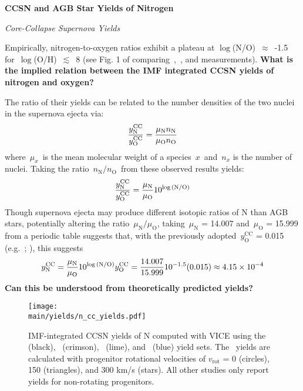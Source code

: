 \documentclass[\main/notes.tex]{subfiles}
\begin{document}
 
\begin{center} 
\textbf{{\Large CCSN and AGB Star Yields of Nitrogen}} 
\end{center} 

\noindent 
{\Large \textit{Core-Collapse Supernova Yields}} 
\par\noindent 
Empirically, nitrogen-to-oxygen ratios exhibit a plateau at 
$\log$(N/O)~$\approx$~-1.5 for~$\log$(O/H)~$\lesssim$~8 (see Fig. 1 of 
\citealp{Vincenzo2016} comparing~\citealp{Berg2012},~\citealp*{Izotov2012}, and 
\citealp{James2015} measurements). 
\twolineskip 
\textbf{What is the implied relation between the IMF integrated CCSN yields of 
nitrogen and oxygen?} 
\par\noindent 
The ratio of their yields can be related to the number densities of the two 
nuclei in the supernova ejecta via: 
\begin{equation} 
\frac{\displaystyle y_\text{N}^\text{CC}}{\displaystyle y_\text{O}^\text{CC}} = 
\frac{\displaystyle \mu_\text{N}n_\text{N}}{\displaystyle \mu_\text{O}n_\text{O}} 
\end{equation} 
where~$\mu_x$~is the mean molecular weight of a species~$x$~and~$n_x$ is the 
number of nuclei. Taking the ratio~$n_\text{N}/n_\text{O}$~from these observed 
results yields: 
\begin{equation} 
\frac{\displaystyle y_\text{N}^\text{CC}}{\displaystyle y_\text{O}^\text{CC}} = 
\frac{\displaystyle \mu_\text{N}}{\displaystyle \mu_\text{O}}10^{\log\text{(N/O)}} 
\end{equation} 
Though supernova ejecta may produce different isotopic ratios of N than AGB 
stars, potentially  
altering the ratio~$\mu_\text{N}/\mu_\text{O}$, taking~$\mu_\text{N}$ = 14.007 
and~$\mu_\text{O}$ = 15.999 from a periodic table suggests that, with the 
previously adopted~$y_\text{O}^\text{CC}$ = 0.015 (e.g.~\citealp*{Weinberg2017}; 
\citealp{Johnson2020}), this suggests 
\begin{equation} 
y_\text{N}^\text{CC} = \frac{\displaystyle \mu_\text{N}}{\displaystyle \mu_\text{O}}10^{\log\text{(N/O)}} 
y_\text{O}^\text{CC} = \frac{\displaystyle 14.007}{\displaystyle 15.999}10^{-1.5}(0.015) \approx 
4.15\times10^{-4} 
\end{equation} 
\twolineskip 
\textbf{Can this be understood from theoretically predicted yields?} 

\begin{figure}[!t] 
\centering 
\texttt{[image: \\main/yields/n\_cc\_yields.pdf]} 
\caption{IMF-integrated CCSN yields of N computed with VICE using the 
\citet{Limongi2018} (black),~\citet{Sukhbold2016} (crimson),~\citet{Nomoto2013} 
(lime), and~\citet{Woosley1995} (blue) yield sets. The~\citet{Limongi2018} 
yields are calculated with progenitor rotational velocities of 
$v_\text{rot}$ = 0 (circles), 150 (triangles), and 300 km/s (stars). All other 
studies only report yields for non-rotating progenitors. } 
\label{fig:n_cc_yields} 
\end{figure} 
\end{document}

